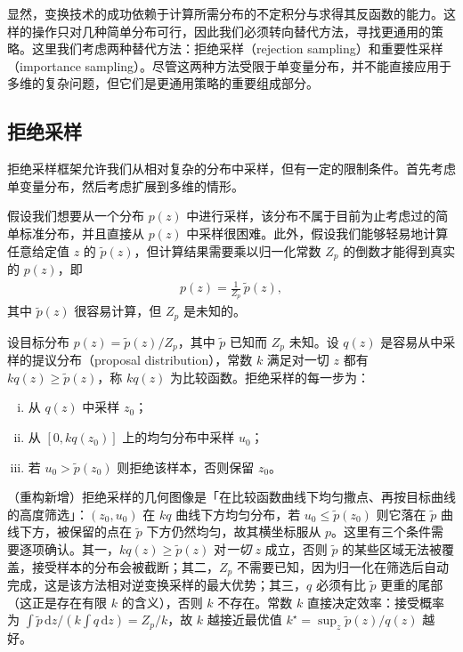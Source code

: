 \documentclass[../../main.tex]{subfiles}
\begin{document}
显然，变换技术的成功依赖于计算所需分布的不定积分与求得其反函数的能力。这样的操作只对几种简单分布可行，因此我们必须转向替代方法，寻找更通用的策略。这里我们考虑两种替代方法：拒绝采样（rejection sampling）和重要性采样（importance sampling）。尽管这两种方法受限于单变量分布，并不能直接应用于多维的复杂问题，但它们是更通用策略的重要组成部分。

\subsection{拒绝采样}\label{subsection:ch14-拒绝采样}

拒绝采样框架允许我们从相对复杂的分布中采样，但有一定的限制条件。首先考虑单变量分布，然后考虑扩展到多维的情形。

假设我们想要从一个分布 $p(z)$ 中进行采样，该分布不属于目前为止考虑过的简单标准分布，并且直接从 $p(z)$ 中采样很困难。此外，假设我们能够轻易地计算任意给定值 $z$ 的 $\widetilde{p}(z)$，但计算结果需要乘以归一化常数 $Z_{p}$ 的倒数才能得到真实的 $p(z)$，即
\begin{align}
p(z)=\frac{1}{Z_{p}}\,\widetilde{p}(z),
\label{align:ch14-未归一化}
\end{align}
其中 $\widetilde{p}(z)$ 很容易计算，但 $Z_{p}$ 是未知的。

\begin{definition}[拒绝采样]\label{definition:ch14-拒绝采样}
设目标分布 $p(z)=\widetilde{p}(z)/Z_{p}$，其中 $\widetilde{p}$ 已知而 $Z_{p}$ 未知。设 $q(z)$ 是容易从中采样的提议分布（proposal distribution），常数 $k$ 满足对一切 $z$ 都有 $kq(z)\geqslant\widetilde{p}(z)$，称 $kq(z)$ 为比较函数。拒绝采样的每一步为：
\begin{enumerate}[(i)]
\item 从 $q(z)$ 中采样 $z_{0}$；
\item 从 $[0,kq(z_{0})]$ 上的均匀分布中采样 $u_{0}$；
\item 若 $u_{0}>\widetilde{p}(z_{0})$ 则拒绝该样本，否则保留 $z_{0}$。
\end{enumerate}
\end{definition}

\begin{remark}（重构新增）拒绝采样的几何图像是「在比较函数曲线下均匀撒点、再按目标曲线的高度筛选」：$(z_{0},u_{0})$ 在 $kq$ 曲线下方均匀分布，若 $u_{0}\leqslant\widetilde{p}(z_{0})$ 则它落在 $\widetilde{p}$ 曲线下方，被保留的点在 $\widetilde{p}$ 下方仍然均匀，故其横坐标服从 $p$。这里有三个条件需要逐项确认。其一，$kq(z)\geqslant\widetilde{p}(z)$ 对\emph{一切} $z$ 成立，否则 $\widetilde{p}$ 的某些区域无法被覆盖，接受样本的分布会被截断；其二，$Z_{p}$ 不需要已知，因为归一化在筛选后自动完成，这是该方法相对逆变换采样的最大优势；其三，$q$ 必须有比 $\widetilde{p}$ 更重的尾部（这正是存在有限 $k$ 的含义），否则 $k$ 不存在。常数 $k$ 直接决定效率：接受概率为 $\int\widetilde{p}\,\mathrm{d}z/\left(k\int q\,\mathrm{d}z\right)=Z_{p}/k$，故 $k$ 越接近最优值 $k^{\star}=\sup_{z}\widetilde{p}(z)/q(z)$ 越好。
\end{remark}
\end{document}
